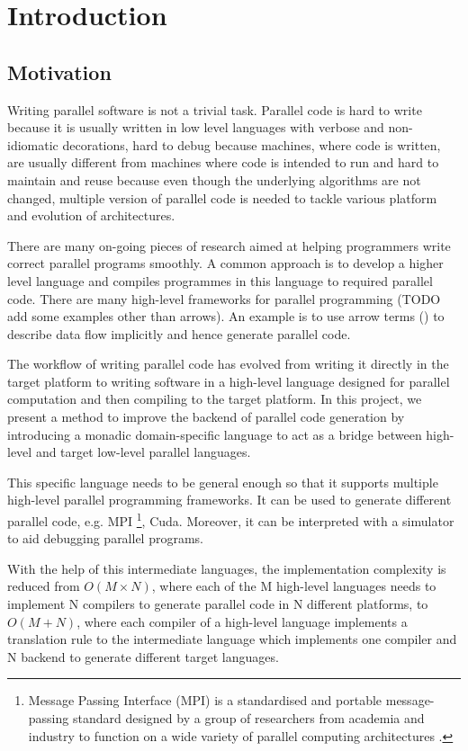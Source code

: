 \chapter{Introduction}
\section{Motivation} \label{i:m}
Writing parallel software is not a trivial task. Parallel code is hard to write because it is usually written in low level languages with verbose and non-idiomatic decorations, hard to debug because machines, where code is written, are usually different from machines where code is intended to run and hard to maintain and reuse because even though the underlying algorithms are not changed, multiple version of parallel code is needed to tackle various platform and evolution of architectures.

There are many on-going pieces of research aimed at helping programmers write correct parallel programs smoothly. A common approach is to develop a higher level language and compiles programmes in this language to required parallel code. There are many high-level frameworks for parallel programming (TODO add some examples other than arrows). An example is to use arrow terms () to describe data flow implicitly and hence generate parallel code.

The workflow of writing parallel code has evolved from writing it directly in the target platform to writing software in a high-level language designed for parallel computation and then compiling to the target platform. In this project, we present a method to improve the backend of parallel code generation by introducing a monadic domain-specific language to act as a bridge between high-level and target low-level parallel languages.

This specific language needs to be general enough so that it supports multiple high-level parallel programming frameworks. It can be used to generate different parallel code, e.g. MPI \footnote{Message Passing Interface (MPI) is a standardised and portable message-passing standard designed by a group of researchers from academia and industry to function on a wide variety of parallel computing architectures \cite{MessagePassingInterface2018}.}, Cuda. Moreover, it can be interpreted with a simulator to aid debugging parallel programs.

With the help of this intermediate languages, the implementation complexity is reduced from $O(M \times N)$, where each of the M high-level languages needs to implement N compilers to generate parallel code in N different platforms, to $O(M + N)$, where each compiler of a high-level language implements a translation rule to the intermediate language which implements one compiler and N backend to generate different target languages.

